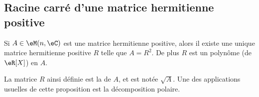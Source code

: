 \subsection{Racine carré d'une matrice hermitienne positive}

\begin{proposition}     \label{PropVZvCWn}
    Si \( A\in \eM(n,\eC)\) est une matrice hermitienne positive, alors il existe une unique matrice hermitienne positive \( R\) telle que \( A=R^2\). De plus \( R\) est un polynôme (de \( \eR[X]\)) en \( A\).
\end{proposition}

La matrice \( R\) ainsi définie est la  de \( A\), et est notée \( \sqrt{A}\). Une des applications usuelles de cette proposition est la décomposition polaire.


